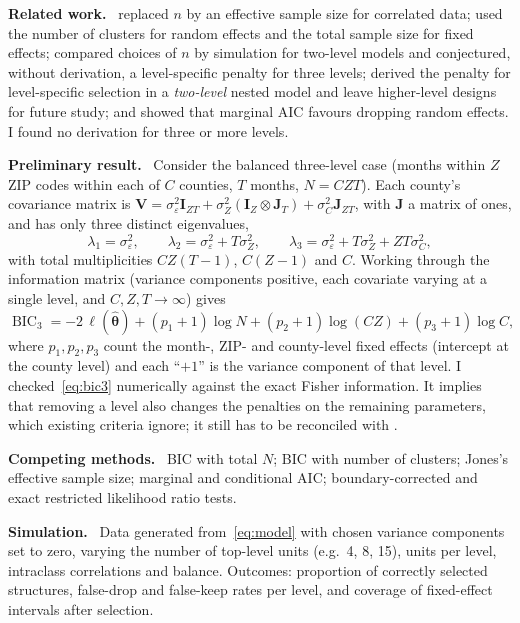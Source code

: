 \documentclass[10pt]{article}
\newcommand{\para}[1]{\textbf{#1}\ }
\DeclareMathOperator{\BIC}{BIC}
\begin{document}
\para{Related work.} \citet{jones2011} replaced $n$ by an effective sample size for correlated data; \citet{delattre2014} used the number of clusters for random effects and the total sample size for fixed effects; \citet{lorah2019} compared choices of $n$ by simulation for two-level models and conjectured, without derivation, a level-specific penalty for three levels; \citet{cho2024} derived the penalty for level-specific selection in a \emph{two-level} nested model and leave higher-level designs for future study; and \citet{greven2010} showed that marginal AIC favours dropping random effects. I found no derivation for three or more levels.

\para{Preliminary result.} Consider the balanced three-level case (months within $Z$ ZIP codes within each of $C$ counties, $T$ months, $N = CZT$). Each county's covariance matrix is $\bm{V} = \sigma^2_\varepsilon \bm{I}_{ZT} + \sigma^2_Z(\bm{I}_Z \otimes \bm{J}_T) + \sigma^2_C \bm{J}_{ZT}$, with $\bm J$ a matrix of ones, and has only three distinct eigenvalues,
\begin{equation}\label{eq:eigen}
  \lambda_1 = \sigma^2_\varepsilon,\qquad
  \lambda_2 = \sigma^2_\varepsilon + T\sigma^2_Z,\qquad
  \lambda_3 = \sigma^2_\varepsilon + T\sigma^2_Z + ZT\sigma^2_C,
\end{equation}
with total multiplicities $CZ(T-1)$, $C(Z-1)$ and $C$. Working through the information matrix (variance components positive, each covariate varying at a single level, and $C, Z, T \to \infty$) gives
\begin{equation}\label{eq:bic3}
  \BIC_3 = -2\,\ell(\hat{\bm\theta}) + (p_1+1)\log N + (p_2+1)\log(CZ) + (p_3+1)\log C,
\end{equation}
where $p_1, p_2, p_3$ count the month-, ZIP- and county-level fixed effects (intercept at the county level) and each ``$+1$'' is the variance component of that level. I checked~\eqref{eq:bic3} numerically against the exact Fisher information. It implies that removing a level also changes the penalties on the remaining parameters, which existing criteria ignore; it still has to be reconciled with \citet{cho2024}.

\para{Competing methods.} BIC with total $N$; BIC with number of clusters; Jones's effective sample size; marginal and conditional AIC; boundary-corrected and exact restricted likelihood ratio tests.

\para{Simulation.} Data generated from~\eqref{eq:model} with chosen variance components set to zero, varying the number of top-level units (e.g.\ 4, 8, 15), units per level, intraclass correlations and balance. Outcomes: proportion of correctly selected structures, false-drop and false-keep rates per level, and coverage of fixed-effect intervals after selection.
\end{document}
